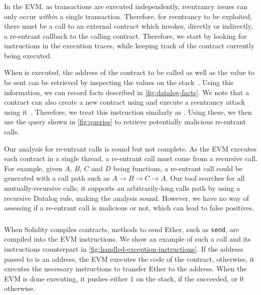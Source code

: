 


\subsubsection{\reentrancy}
In the EVM, as transactions are executed independently, reentrancy issues can only occur \emph{within} a single transaction.
Therefore, for reentrancy to be exploited, there must be a call to an external contract which invokes, directly or indirectly, a re-entrant callback to the calling contract.
Therefore, we start by looking for  instructions in the execution traces, while keeping track of the contract currently being executed.

When  is executed, the address of the contract to be called as well as the value to be sent can be retrieved by inspecting the values on the stack~\cite{wood2014ethereum}. Using this information, we can record  facts described in \autoref{fig:datalog-facts}.
We note that a contract can also create a new contract using  and execute a reentrancy attack using it~\cite{Rodler2019}.
Therefore, we treat this instruction similarly as .
Using these, we then use the query shown in \autoref{fig:queries} to retrieve potentially malicious re-entrant calls.

\correctness Our analysis for re-entrant calls is sound but not complete. As the EVM executes each contract in a single thread, a re-entrant call must come from a recursive call. For example, given $A$, $B$, $C$ and $D$ being functions, a re-entrant call could be generated with a call path such as $A\rightarrow B \rightarrow C\rightarrow A$. Our tool searches for all mutually-recursive calls; it supports an arbitrarily-long calls path by using a recursive Datalog rule, making the analysis sound. However, we have no way of assessing if a re-entrant call is malicious or not, which can lead to false positives.

\subsubsection{\unhandledexceptions}
%
When Solidity compiles contracts, methods to send Ether, such as \lstinline{send}, are compiled into the EVM  instructions. We show an example of such a call and its instructions counterpart in \autoref{fig:handled-exception-instructions}.
If the address passed to  is an address, the EVM executes the code of the contract, otherwise, it executes the necessary instructions to transfer Ether to the address. When the EVM is done executing, it pushes either $1$ on the stack, if the  succeeded, or $0$ otherwise.


